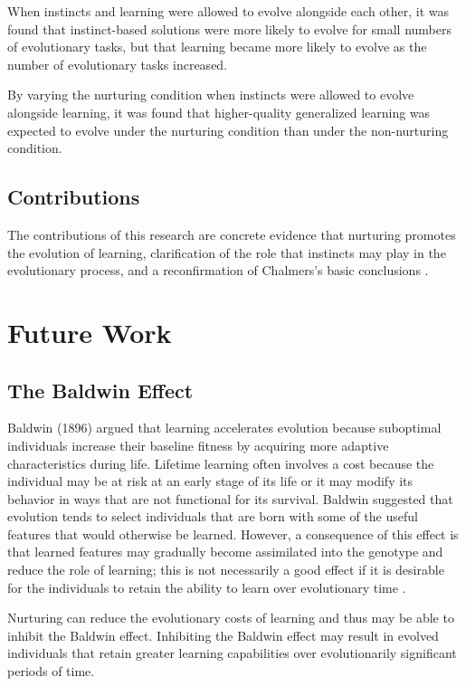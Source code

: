 \documentclass[master]{outhesis}
\begin{document}
When instincts and learning were allowed to evolve alongside each other, 
it was found that instinct-based solutions were more likely to evolve for small numbers of evolutionary tasks, 
but that learning became more likely to evolve as the number of evolutionary tasks increased.

By varying the nurturing condition when instincts were allowed to evolve alongside learning, 
it was found that higher-quality generalized learning was expected to evolve under the nurturing condition than under the non-nurturing condition.

\section{Contributions}

The contributions of this research are
concrete evidence that nurturing promotes the evolution of learning,
clarification of the role that instincts may play in the evolutionary process,
and a reconfirmation of Chalmers's basic conclusions \citep{Chalmers:1990aa}.

\chapter{Future Work}

\section{The Baldwin Effect}

Baldwin (1896) argued that learning accelerates evolution because suboptimal individuals increase their baseline fitness by acquiring more adaptive characteristics during life. 
Lifetime learning often involves a cost because the individual may be at risk at an early stage of its life or it may modify its behavior in ways that are not functional for its survival.
Baldwin suggested that evolution tends to select individuals that are born with some of the useful features that would otherwise be learned.
However, a consequence of this effect is that learned features may gradually become assimilated into the genotype and reduce the role of learning;
this is not necessarily a good effect if it is desirable for the individuals to retain the ability to learn over evolutionary time \citep{Floreano:2008wv}.

Nurturing can reduce the evolutionary costs of learning and thus may be able to inhibit the Baldwin effect.
Inhibiting the Baldwin effect may result in evolved individuals that retain greater learning capabilities over evolutionarily significant periods of time.

{}


\makebackmatter
\end{document}
